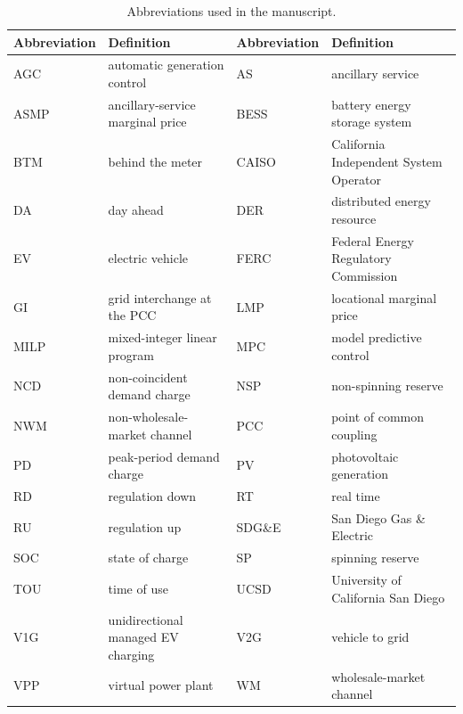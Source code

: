 \documentclass[final,5p,times]{elsarticle}
\begin{document}
\begin{table}[H]
\centering
\caption{Abbreviations used in the manuscript.}
\label{tab:abbreviations}
\scriptsize
\begin{tabularx}{\textwidth}{@{}p{}X p{}X@{}}
\toprule
Abbreviation & Definition & Abbreviation & Definition \\
\midrule
AGC & automatic generation control & AS & ancillary service \\
ASMP & ancillary-service marginal price & BESS & battery energy storage system \\
BTM & behind the meter & CAISO & California Independent System Operator \\
DA & day ahead & DER & distributed energy resource \\
EV & electric vehicle & FERC & Federal Energy Regulatory Commission \\
GI & grid interchange at the PCC & LMP & locational marginal price \\
MILP & mixed-integer linear program & MPC & model predictive control \\
NCD & non-coincident demand charge & NSP & non-spinning reserve \\
NWM & non-wholesale-market channel & PCC & point of common coupling \\
PD & peak-period demand charge & PV & photovoltaic generation \\
RD & regulation down & RT & real time \\
RU & regulation up & SDG\&E & San Diego Gas \& Electric \\
SOC & state of charge & SP & spinning reserve \\
TOU & time of use & UCSD & University of California San Diego \\
V1G & unidirectional managed EV charging & V2G & vehicle to grid \\
VPP & virtual power plant & WM & wholesale-market channel \\
\bottomrule
\end{tabularx}
\end{table}
\end{document}
